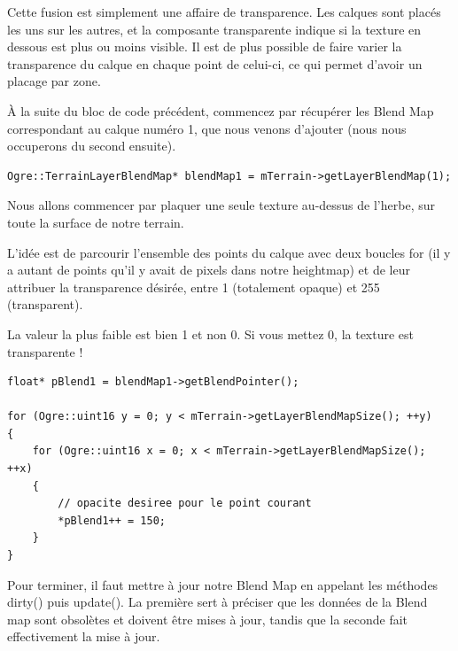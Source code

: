 Cette fusion est simplement une affaire de transparence. Les calques sont plac\'es les uns sur les autres, et la composante transparente indique si la texture en dessous est plus ou moins visible. Il est de plus possible de faire varier la transparence du calque en chaque point de celui-ci, ce qui permet d'avoir un placage par zone.\newline

\`A la suite du bloc de code pr\'ec\'edent, commencez par r\'ecup\'erer les Blend Map correspondant au calque num\'ero 1, que nous venons d'ajouter (nous nous occuperons du second ensuite).

\begin{lstlisting}[caption={R\'ecup\'eration du Blend Map pour le premier terrain}]
Ogre::TerrainLayerBlendMap* blendMap1 = mTerrain->getLayerBlendMap(1);
\end{lstlisting}

Nous allons commencer par plaquer une seule texture au-dessus de l'herbe, sur toute la surface de notre terrain.

L'id\'ee est de parcourir l'ensemble des points du calque avec deux boucles for (il y a autant de points qu'il y avait de pixels dans notre heightmap) et de leur attribuer la transparence d\'esir\'ee, entre 1 (totalement opaque) et 255 (transparent).

La valeur la plus faible est bien 1 et non 0. Si vous mettez 0, la texture est transparente !

\begin{lstlisting}[caption={Attribution de la transparence d\'esir\'ee sur tous les points du calque}]
float* pBlend1 = blendMap1->getBlendPointer();

for (Ogre::uint16 y = 0; y < mTerrain->getLayerBlendMapSize(); ++y)
{
    for (Ogre::uint16 x = 0; x < mTerrain->getLayerBlendMapSize(); ++x)
    {   
        // opacite desiree pour le point courant
        *pBlend1++ = 150;
    }
}
\end{lstlisting}















Pour terminer, il faut mettre \`a jour notre Blend Map en appelant les m\'ethodes dirty() puis update(). La premi\`ere sert \`a pr\'eciser que les donn\'ees de la Blend map sont obsol\`etes et doivent \^etre mises \`a jour, tandis que la seconde fait effectivement la mise \`a jour.

